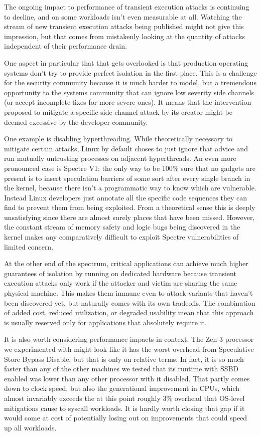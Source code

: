 \label{s:discussion}
The ongoing impact to performance of transient execution attacks is continuing to decline, and on some workloads isn't even measurable at all.
Watching the stream of new transient execution attacks being published might not give this impression, but that comes from mistakenly looking at the quantity of attacks independent of their performance drain.

One aspect in particular that that gets overlooked is that production operating systems don't try to provide perfect isolation in the first place.
This is a challenge for the security community because it is much harder to model, but a tremendous opportunity to the systems community that can ignore low severity side channels (or accept incomplete fixes for more severe ones).
It means that the intervention proposed to mitigate a specific side channel attack by its creator might be deemed excessive by the developer community.

One example is disabling hyperthreading.
While theoretically necessary to mitigate certain attacks, Linux by default choses to just ignore that advice and run mutually untrusting processes on adjacent hyperthreads.
An even more pronounced case is Spectre V1: the only way to be 100\% sure that no gadgets are present is to insert speculation barriers of some sort after every single branch in the kernel, because there isn't a programmatic way to know which are vulnerable.
Instead Linux developers just annotate all the specific code sequences they can find to prevent them from being exploited.
From a theoretical sense this is deeply unsatisfying since there are almost surely places that have been missed.
However, the constant stream of memory safety and logic bugs being discovered in the kernel makes any comparatively difficult to exploit Spectre vulnerabilities of limited concern.

At the other end of the spectrum, critical applications can achieve much higher guarantees of isolation by running on dedicated hardware because transient execution attacks only work if the attacker and victim are sharing the same physical machine.
This makes them immune even to attack variants that haven't been discovered yet, but naturally comes with its own tradeoffs.
The combination of added cost, reduced utilization, or degraded usability mean that this approach is usually reserved only for applications that absolutely require it.

It is also worth considering performance impacts in context.
The Zen 3 processor we experimented with might look like it has the worst overhead from Speculative Store Bypass Disable, but that is only on relative terms.
In fact, it is so much faster than any of the other machines we tested that its runtime with SSBD enabled was lower than any other processor with it disabled.
That partly comes down to clock speed, but also the generational improvement in CPUs, which almost invariably exceeds the at this point roughly 3\% overhead that OS-level mitigations cause to syscall workloads.
It is hardly worth closing that gap if it would come at cost of potentially losing out on improvements that could speed up all workloads.

